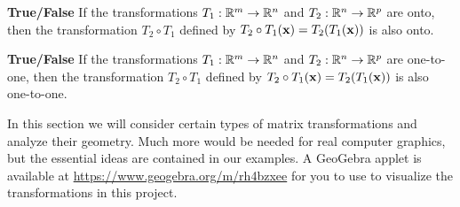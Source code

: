 \item \textbf{True/False} If the transformations $T_1: \mathbb{R}^m \to \mathbb{R}^n$ and $T_2:\mathbb{R}^n \to \mathbb{R}^p$ are onto, then the transformation $T_2 \circ T_1$ defined by $T_2\circ T_1(\mathbf{x})=T_2(T_1(\mathbf{x}))$ is also onto.

\item \textbf{True/False} If the transformations $T_1: \mathbb{R}^m \to \mathbb{R}^n$ and $T_2:\mathbb{R}^n \to \mathbb{R}^p$ are one-to-one, then the transformation $T_2 \circ T_1$ defined by $T_2\circ T_1(\mathbf{x})=T_2(T_1(\mathbf{x}))$ is also one-to-one.

\ea
\ee


In this section we will consider certain types of matrix transformations and analyze their geometry. Much more would be needed for real computer graphics, but the essential ideas are contained in our examples. A GeoGebra applet is available at \url{https://www.geogebra.org/m/rh4bzxee} for you to use to visualize the transformations in this project. 

